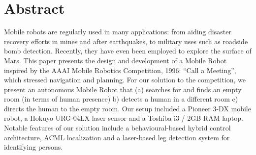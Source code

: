 \documentclass{article}
\begin{document}
    \section{Abstract}
		Mobile robots are regularly used in many applications: from aiding disaster recovery efforts in mines and after earthquakes, to military uses such as roadside bomb detection. Recently, they have even been employed to explore the surface of Mars. This paper presents the design and development of a Mobile Robot inspired by the AAAI Mobile Robotics Competition, 1996: “Call a Meeting”, which stressed navigation and planning.  For our solution to the competition, we present an autonomous Mobile Robot that (a) searches for and finds an empty room (in terms of human presence) b) detects a human in a different room c) directs the human to the empty room. Our setup included a Pioneer 3-DX mobile robot, a Hokuyo URG-04LX laser sensor and a Toshiba i3 / 2GB RAM laptop. Notable features of our solution include a behavioural-based hybrid control architecture, ACML localization and a laser-based leg detection system for identifying persons.
    
    \newpage
\end{document}
